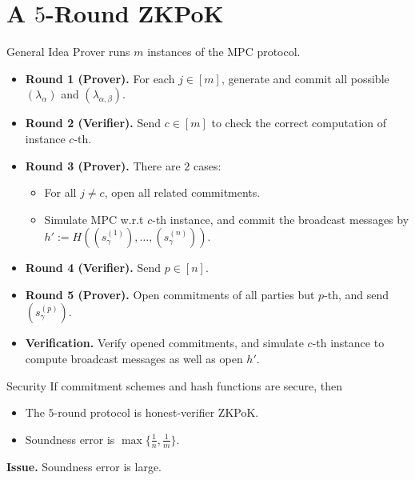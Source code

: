 \documentclass{beamer}
\begin{document}
	\section{A $5$-Round ZKPoK}
	\begin{frame}{General Idea} 
		Prover runs $m$ instances of the MPC protocol.\pause
		\begin{itemize}
			\item \textbf{Round 1 (Prover).} For each $j \in [m]$, generate and commit all possible $(\lambda_\alpha)$ and $(\lambda_{\alpha,\beta})$.\pause
			\item \textbf{Round 2 (Verifier).} Send $c \in [m]$ to check the correct computation of instance $c$-th.\pause
			\item \textbf{Round 3 (Prover).} There are $2$ cases:\pause
			\begin{itemize}
				\item For all $j \neq c$, open all related commitments.\pause
				\item Simulate MPC w.r.t $c$-th instance, and commit the broadcast messages by $h' := H\left((s_\gamma^{(1)}), \dots, (s_\gamma^{(n)})\right)$.\pause
			\end{itemize}
			\item \textbf{Round 4 (Verifier).} Send $p \in [n]$.\pause
			\item \textbf{Round 5 (Prover).} Open commitments of all parties but $p$-th, and send $(s_\gamma^{(p)})$.\pause
			\item \textbf{Verification.} Verify opened commitments, and simulate $c$-th instance to compute broadcast messages as well as open $h'$.
		\end{itemize}
	\end{frame}

	\begin{frame}{Security}
		If commitment schemes and hash functions are secure, then \pause
		\begin{itemize}
			\item The $5$-round protocol is honest-verifier ZKPoK.\pause
			\item Soundness error is $\max\{\frac{1}{n}, \frac{1}{m}\}$.\pause
		\end{itemize}
		\textbf{Issue.} Soundness error is large.
	\end{frame}
\end{document}
